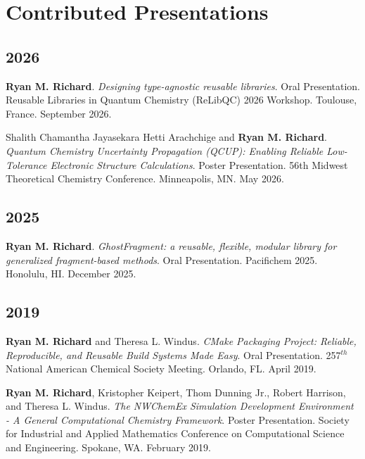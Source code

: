 \section{Contributed Presentations}
\vspace{5pt}
\begin{etaremune}
	\item[]{}
	\subsection{2026}
	\item{\textbf{Ryan M. Richard}.
	         \textit{Designing type-agnostic reusable libraries}.
	         Oral Presentation.
	         Reusable Libraries in Quantum Chemistry (ReLibQC) 2026 Workshop.
	         Toulouse, France. September 2026.
	}
	\item{Shalith Chamantha Jayasekara Hetti Arachchige and  \textbf{Ryan M. Richard}.
	         \textit{Quantum Chemistry Uncertainty Propagation (QCUP): Enabling Reliable Low-Tolerance Electronic Structure Calculations}.
                  Poster Presentation.
	         56th Midwest Theoretical Chemistry Conference.
	         Minneapolis, MN. May 2026.}
	\subsection{2025}
	\item{\textbf{Ryan M. Richard}. \textit{GhostFragment: a reusable, flexible,
	         modular library for generalized fragment-based methods}.  Oral Presentation.
	         Pacifichem 2025. Honolulu, HI. December 2025.}
	\subsection{2019}
	\item{\textbf{Ryan M. Richard} and Theresa L. Windus. \textit{CMake
	      Packaging Project: Reliable, Reproducible, and Reusable Build Systems
		  Made Easy}. Oral Presentation. 257$^{th}$ National American Chemical Society Meeting.
		  Orlando, FL. April 2019.}
	\item{\textbf{Ryan M. Richard}, Kristopher Keipert, Thom Dunning Jr.,
	      Robert Harrison, and Theresa L. Windus. \textit{The NWChemEx
		  Simulation Development Environment - A General Computational Chemistry
		  Framework}. Poster Presentation. Society for Industrial and Applied
		  Mathematics Conference on Computational Science and Engineering.
		  Spokane, WA. February 2019.}


\end{etaremune}
